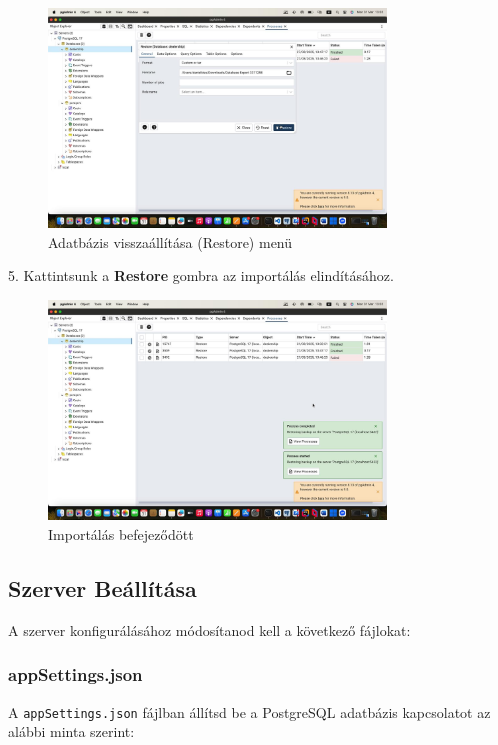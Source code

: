 \documentclass{report}[11pt]
\begin{document}
   \begin{figure}[H]
    \centering
    \includegraphics[width=0.8\textwidth]{figures/db_restore.png}
    \caption{Adatbázis visszaállítása (Restore) menü}
    \label{fig:restore_menu}
\end{figure}


5. Kattintsunk a \textbf{Restore} gombra az importálás elindításához.



\begin{figure}[H]
    \centering
    \includegraphics[width=0.8\textwidth]{figures/restore_complete.png}
    \caption{Importálás befejeződött}
    \label{fig:restore_complete}
\end{figure}


\subsection{Szerver Beállítása}
A szerver konfigurálásához módosítanod kell a következő fájlokat:

\subsubsection{appSettings.json}
A \texttt{appSettings.json} fájlban állítsd be a PostgreSQL adatbázis kapcsolatot az alábbi minta szerint:
\end{document}
